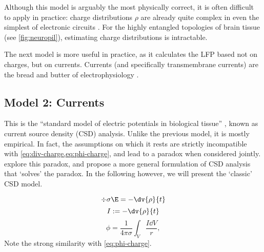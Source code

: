Although this model is arguably the most physically correct, it is often difficult to apply in practice: charge distributions $\rho$ are already quite complex in even the simplest of electronic circuits \cite[chapter 8]{Chabay2015}. For the highly entangled topologies of brain tissue (see \cref{fig:neuropil}), estimating charge distributions is intractable.

The next model is more useful in practice, as it calculates the LFP based not on charges, but on currents. Currents (and specifically transmembrane currents) are the bread and butter of electrophysiology \cite{Kandel2013a}.



\subsection{Model 2: Currents}

This is the ``standard model of electric potentials in biological tissue'' \cite{Bedard2011}, known as current source density (CSD) analysis. Unlike the previous model, it is mostly empirical. In fact, the assumptions on which it rests are strictly incompatible with \cref{eq:div-charge,eq:phi-charge}, and lead to a paradox when considered jointly.  explore this paradox, and propose a more general formulation of CSD analysis that `solves' the paradox. In the following however, we will present the `classic' CSD model.


%
\begin{equation}
\label{eq:div-current}
\div{\sigma \E} = - \dv{\rho}{t}
\end{equation}
%
%
\begin{equation}
\label{eq:CSD}
I := - \dv{\rho}{t}
\end{equation}
%
%
\begin{equation}
\label{eq:phi-current}
\phi = \frac{1}{4 \pi \sigma} \int_V \frac{I \dd{V}}{r},
\end{equation}
%
Note the strong similarity with \cref{eq:phi-charge}.






